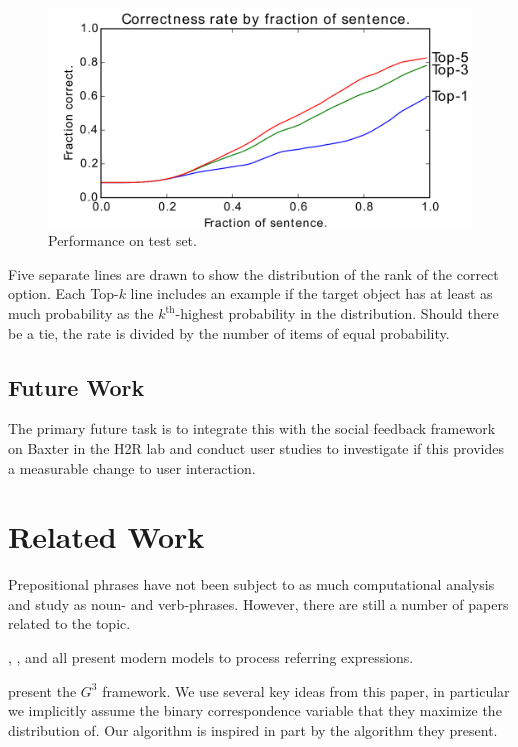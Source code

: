 \documentclass[letterpaper,10pt]{article}
\begin{document}
\begin{figure}[H]
  \centering
  \includegraphics[scale=.66]{eval/cdf_by_fraction}
  \caption{Performance on test set.}
  \label{fig:results_inc}
\end{figure}


Five separate lines are drawn to show the distribution of the rank of the correct option. Each Top-$k$ line includes an example if the target object has at least as much probability as the $k^\text{th}$-highest probability in the distribution. Should there be a tie, the rate is divided by the number of items of equal probability.


\subsection{Future Work}

The primary future task is to integrate this with the social feedback framework on Baxter in the H2R lab and conduct user studies to investigate if this provides a measurable change to user interaction.


\section{Related Work}

Prepositional phrases have not been subject to as much computational analysis and study as noun- and verb-phrases. However, there are still a number of papers related to the topic. 

\citet{tellex2011understanding}, \citet{UW_RSE_ICML2012}, and \citet{artzi2013weakly} all present modern models to process referring expressions.

\citet{tellex2011understanding} present the $G^3$ framework. We use several key ideas from this paper, in particular we implicitly assume the binary correspondence variable that they maximize the distribution of. Our algorithm is inspired in part by the algorithm they present.
\end{document}
